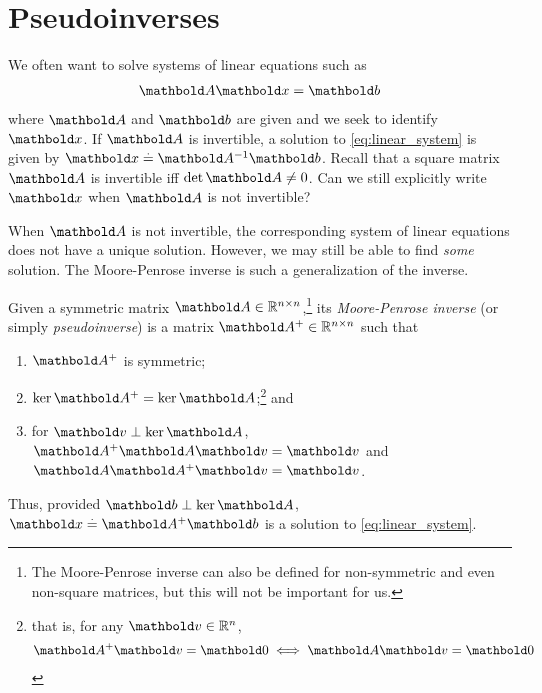 \section{Pseudoinverses}

We often want to solve systems of linear equations such as \begin{align}
    \mA\vx = \vb \label{eq:linear_system}
\end{align} where $\mA$ and $\vb$ are given and we seek to identify $\vx$. If $\mA$ is invertible, a solution to \cref{eq:linear_system} is given by $\vx \defeq \inv{\mA}\vb$. Recall that a square matrix $\mA$ is invertible iff $\det\mA \neq 0$. Can we still explicitly write $\vx$ when $\mA$ is not invertible?

When $\mA$ is not invertible, the corresponding system of linear equations does not have a unique solution. However, we may still be able to find \emph{some} solution. The Moore-Penrose inverse is such a generalization of the inverse.

\begin{defn} Given a symmetric matrix $\mA \in \R^{n \times n}$,\footnote{The Moore-Penrose inverse can also be defined for non-symmetric and even non-square matrices, but this will not be important for us.} its \emph{Moore-Penrose inverse} (or simply \emph{pseudoinverse}) is a matrix $\pinv{\mA} \in \R^{n \times n}$ such that \begin{enumerate}
    \item $\pinv{\mA}$ is symmetric;
    \item $\ker{\pinv{\mA}} = \ker{\mA}$;\footnote{that is, for any $\vv \in \R^n$, \begin{align*}
        \pinv{\mA}\vv = \vZero \iff \mA\vv = \vZero
    \end{align*}} and
    \item for $\vv \perp \ker{\mA}$, $\pinv{\mA}\mA\vv = \vv$ and $\mA\pinv{\mA}\vv = \vv$.
\end{enumerate}
\end{defn}

Thus, provided $\vb \perp \ker\mA$, $\vx \defeq \pinv{\mA}\vb$ is a solution to \cref{eq:linear_system}.


